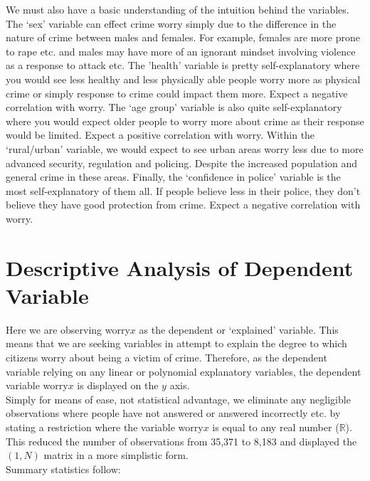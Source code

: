 \documentclass[11pt, english]{article}
\begin{document}
	We must also have a basic understanding of the intuition behind the variables. The `sex' variable can effect crime worry simply due to the difference in the nature of crime between males and females. For example, females are more prone to rape etc. and males may have more of an ignorant mindset involving violence as a response to attack etc. The 'health' variable is pretty self-explanatory where you would see less healthy and less physically able people worry more as physical crime or simply response to crime could impact them more. Expect a negative correlation with worry. The `age group' variable is also quite self-explanatory where you would expect older people to worry more about crime as their response would be limited. Expect a positive correlation with worry. Within the `rural/urban' variable, we would expect to see urban areas worry less due to more advanced security, regulation and policing. Despite the increased population and general crime in these areas. Finally, the `confidence in police' variable is the most self-explanatory of them all. If people believe less in their police, they don't believe they have good protection from crime. Expect a negative correlation with worry.

\newpage

\section{Descriptive Analysis of Dependent Variable}

	Here we are observing worry$x$ as the dependent or `explained' variable. This means that we are seeking variables in attempt to explain the degree to which citizens worry about being a victim of crime. Therefore, as the dependent variable relying on any linear or polynomial explanatory variables, the dependent variable worry$x$ is displayed on the $y$ axis.\\

	Simply for means of ease, not statistical advantage, we eliminate any negligible observations where people have not answered or answered incorrectly etc. by stating a restriction where the variable worry$x$ is equal to any real number ($\mathbb{R}$). This reduced the number of observations from 35,371 to 8,183 and displayed the $(1,N)$ matrix in a more simplistic form.\\

	Summary statistics follow:\\
\end{document}
